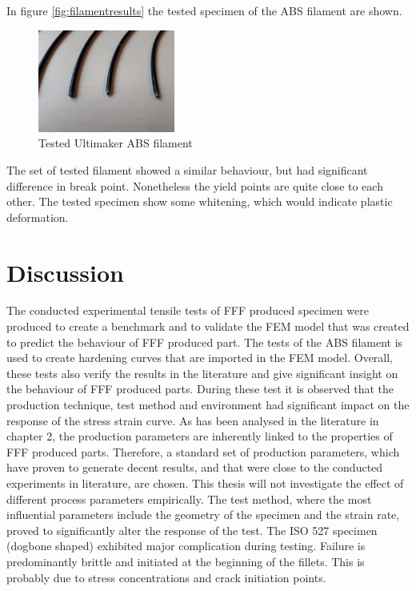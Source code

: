 In figure \ref{fig:filamentresults} the tested specimen of the ABS filament are shown.
\begin{figure}[htb]
    \centering
    \includegraphics[width=0.40\textwidth]{chapter_5_Experimentaltesting/figures/Imagefilament.jpg}
    \caption{Tested Ultimaker ABS filament}
    \label{fig:filamentspecimen}
\end{figure}
The set of tested filament showed a similar behaviour, but had significant difference in break point. Nonetheless the yield points are quite close to each other. The tested specimen show some whitening, which would indicate plastic deformation.  

\section{Discussion}
The conducted experimental tensile tests of FFF produced specimen were produced to create a benchmark and to validate the FEM model that was created to predict the behaviour of FFF produced part. The tests of the ABS filament is used to create hardening curves that are imported in the FEM model. Overall, these tests also verify the results in the literature and give significant insight on the behaviour of FFF produced parts. 
During these test it is observed that the production technique, test method and environment had significant impact on the response of the stress strain curve. As has been analysed in the literature in chapter 2, the production parameters are inherently linked to the properties of FFF produced parts. Therefore, a standard set of production parameters, which have proven to generate decent results, and that were close to the conducted experiments in literature, are chosen. This thesis will not investigate the effect of different process parameters empirically. The test method, where the most influential  parameters include the geometry of the specimen and the strain rate, proved to significantly alter the response of the test. The ISO 527 specimen (dogbone shaped) exhibited major complication during testing. Failure is predominantly brittle and initiated at the beginning of the fillets. This is probably due to stress concentrations and crack initiation points. 

